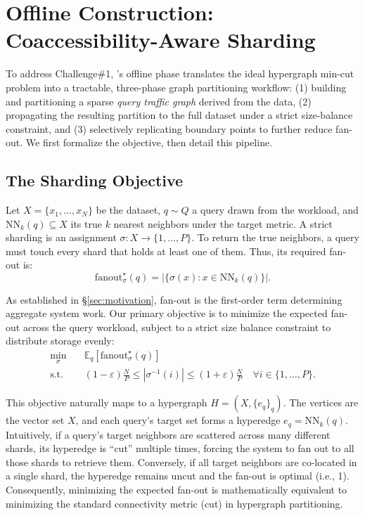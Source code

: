 \section{Offline Construction: Coaccessibility-Aware Sharding}
\label{sec:offline_sharding}

To address Challenge\#1, \sysname's offline phase translates the ideal hypergraph min-cut problem into a tractable, three-phase graph partitioning workflow: (1) building and partitioning a sparse \emph{query traffic graph} derived from the data, (2) propagating the resulting partition to the full dataset under a strict size-balance constraint, and (3) selectively replicating boundary points to further reduce fan-out. We first formalize the objective, then detail this pipeline.

\subsection{The Sharding Objective}
Let $X=\{x_1,\dots,x_N\}$ be the dataset, $q\sim Q$ a query drawn from the workload, and $\mathrm{NN}_k(q)\subseteq X$ its true $k$ nearest neighbors under the target metric. A strict sharding is an assignment $\sigma:X\to\{1,\dots,P\}$. To return the true neighbors, a query must touch every shard that holds at least one of them. Thus, its required fan-out is:
\[
\mathrm{fanout}^\star_\sigma(q)=\bigl|\{\sigma(x):x\in\mathrm{NN}_k(q)\}\bigr|.
\]

As established in \S\ref{sec:motivation}, fan-out is the first-order term determining aggregate system work. Our primary objective is to minimize the expected fan-out across the query workload, subject to a strict size balance constraint to distribute storage evenly:
\begin{equation}
\label{eq:objective}
\begin{aligned}
\min_{\sigma}\quad & \mathbb{E}_{q}\!\left[\mathrm{fanout}^\star_\sigma(q)\right] \\
\text{s.t.}\quad & (1-\varepsilon)\tfrac{N}{P}\le |\sigma^{-1}(i)| \le (1+\varepsilon)\tfrac{N}{P}\quad \forall i \in \{1,\dots,P\}.
\end{aligned}
\end{equation}

This objective naturally maps to a hypergraph $H=(X,\{e_q\}_q)$. The vertices are the vector set $X$, and each query's target set forms a hyperedge $e_q=\mathrm{NN}_k(q)$. Intuitively, if a query's target neighbors are scattered across many different shards, its hyperedge is ``cut'' multiple times, forcing the system to fan out to all those shards to retrieve them. Conversely, if all target neighbors are co-located in a single shard, the hyperedge remains uncut and the fan-out is optimal (i.e., 1). Consequently, minimizing the expected fan-out is mathematically equivalent to minimizing the standard connectivity metric (cut) in hypergraph partitioning.

